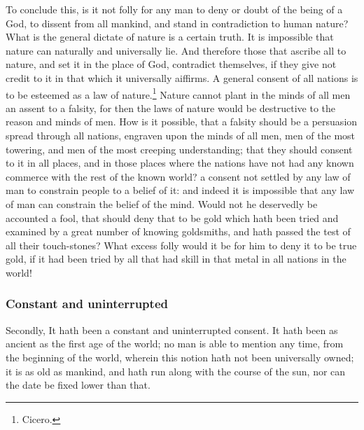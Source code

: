 \documentclass[a5paper]{book}
\begin{document}
To conclude this, 
    is it not folly for any man to deny or doubt of the being of a God, 
    to dissent from all mankind, and stand in contradiction to human nature? 
What is the general dictate of nature is a certain truth. 
It is impossible that nature can naturally and universally lie. 
And therefore those that ascribe all to nature, 
    and set it in the place of God, contradict themselves, 
    if they give not credit to it in that which it universally aiffirms. 
A general consent of all nations is to be esteemed as a law of nature.\footnote{Cicero.} 
Nature cannot plant in the minds of all men an assent to a falsity, 
    for then the laws of nature would be destructive to the reason and minds of men.
How is it possible, that a falsity should be a persuasion spread
    through all nations, 
    engraven upon the minds of all men, 
    men of the most towering, 
    and men of the most creeping understanding; 
    that they should consent to it in all places, 
    and in those places where the nations have not had any known commerce 
    with the rest of the known world? 
    a consent not settled by any law of man to constrain people to a belief of it: 
    and indeed it is impossible that any law of man can constrain 
    the belief of the mind. 
Would not he deservedly be accounted a fool, 
    that should deny that to be gold which hath been tried and examined 
    by a great number of knowing goldsmiths,
    and hath passed the test of all their touch-stones?
What excess folly would it be for him to deny it to be true gold, 
    if it had been tried by all that had skill in that metal 
    in all nations in the world!
\subsubsection{Constant and uninterrupted}
Secondly, It hath been a constant and uninterrupted consent. 
It hath been as ancient as the first age of the world; 
    no man is able to mention any time, 
    from the beginning of the world, 
    wherein this notion hath not been universally owned; 
    it is as old as mankind,
    and hath run along with the course of the sun, 
    nor can the date be fixed lower than that.
\end{document}

